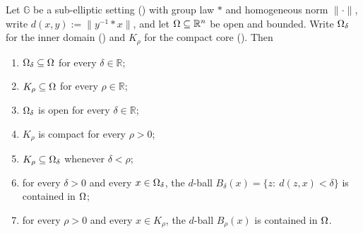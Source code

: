 \begin{theorem}
Let $\mathbb G$ be a sub-elliptic setting () with group law $*$ and
homogeneous norm $\|\cdot\|$, write $d(x,y):=\|y^{-1}*x\|$, and let
$\Omega\subseteq\mathbb R^{n}$ be open and bounded. Write $\Omega_\delta$ for the inner domain
() and $K_\rho$ for the compact core ().
Then
\begin{enumerate}
\item $\Omega_\delta\subseteq\Omega$ for every $\delta\in\mathbb R$;
\item $K_\rho\subseteq\Omega$ for every $\rho\in\mathbb R$;
\item $\Omega_\delta$ is open for every $\delta\in\mathbb R$;
\item $K_\rho$ is compact for every $\rho>0$;
\item $K_\rho\subseteq\Omega_\delta$ whenever $\delta<\rho$;
\item for every $\delta>0$ and every $x\in\Omega_\delta$, the $d$-ball
  $B_\delta(x)=\{z:\ d(z,x)<\delta\}$ is contained in $\Omega$;
\item for every $\rho>0$ and every $x\in K_\rho$, the $d$-ball $B_\rho(x)$ is contained in
  $\Omega$.
\end{enumerate}
\end{theorem}
